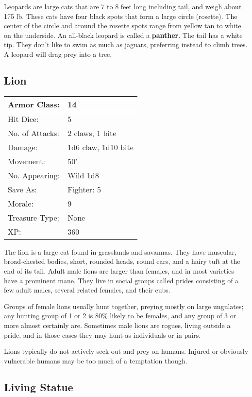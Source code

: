 \documentclass[a4paper,twoside,openany,10pt]{book}
\begin{document}
\begin{multicols}{2}
Leopards are large cats that are 7 to 8 feet long including tail, and
weigh about 175 lb. These cats have four black spots that form a large
circle (rosette). The center of the circle and around the rosette spots
range from yellow tan to white on the underside. An all-black leopard is
called a \textbf{panther}. The tail has a white tip. They don't like to swim
as much as jaguars, preferring instead to climb trees. A leopard will
drag prey into a tree.

\subsection*{Lion}\label{lion}

\begin{tabularx}{0.50\textwidth}{@{}lX@{}}
Armor Class: & 14 \\\hline
Hit Dice: & 5 \\\hline
No. of Attacks: & 2 claws, 1 bite \\\hline
Damage: & 1d6 claw, 1d10 bite \\\hline
Movement: & 50' \\\hline
No. Appearing: & Wild 1d8 \\\hline
Save As: & Fighter: 5 \\\hline
Morale: & 9 \\\hline
Treasure Type: & None \\\hline
XP: & 360 \\\hline
\end{tabularx}\medskip

The lion is a large cat found in grasslands and savannas. They have muscular, broad-chested bodies, short, rounded heads, round ears, and a hairy tuft at the end of its tail. Adult male lions are larger than females, and in most varieties have a prominent mane. They live in social groups called prides consisting of a few adult males, several related females, and their cubs.

Groups of female lions usually hunt together, preying mostly on large ungulates; any hunting group of 1 or 2 is 80\% likely to be females, and any group of 3 or more almost certainly are. Sometimes male lions are rogues, living outside a pride, and in those cases they may hunt as individuals or in pairs.

Lions typically do not actively seek out and prey on humans. Injured or obviously vulnerable humans may be too much of a temptation though.

\subsection*{Living Statue}\label{living-statue}


\end{multicols}
\end{document}
